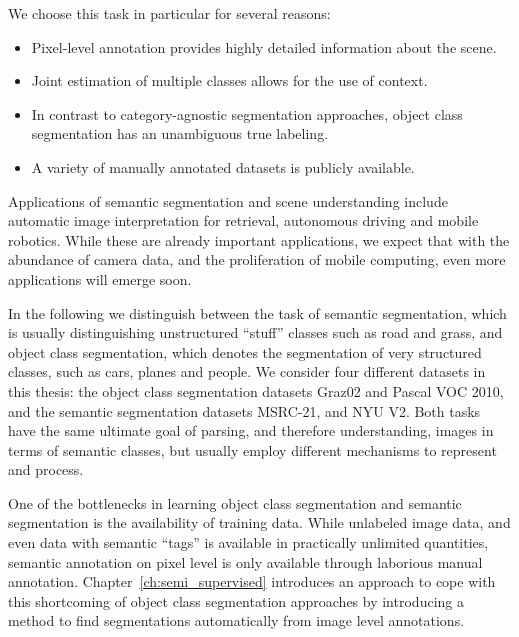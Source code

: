 We choose this task in particular for several reasons:
\begin{itemize}
    \item Pixel-level annotation provides highly detailed information about the scene.
    \item Joint estimation of multiple classes allows for the use of context.
    \item In contrast to category-agnostic segmentation approaches, object class segmentation
        has an unambiguous true labeling.
    \item A variety of manually annotated datasets is publicly available.
\end{itemize}
%
Applications of semantic segmentation and scene understanding include automatic
image interpretation for retrieval, autonomous driving and mobile robotics.
While these are already important applications, we expect that with the
abundance of camera data, and the proliferation of mobile computing, even
more applications will emerge soon.

In the following we distinguish between the task of semantic segmentation,
which is usually distinguishing unstructured ``stuff'' classes such as road and
grass, and object class segmentation, which denotes the segmentation of very
structured classes, such as cars, planes and people.
We consider four different datasets in this thesis: the object class segmentation
datasets Graz02 and Pascal VOC 2010, and the semantic segmentation datasets MSRC-21,
and NYU V2.
%
Both tasks have the same ultimate goal of parsing, and therefore understanding, images
in terms of semantic classes, but usually employ  different mechanisms to represent and process.

One of the bottlenecks in learning object class segmentation and semantic
segmentation is the availability of training data.  While unlabeled image data,
and even data with semantic
``tags'' is available in practically unlimited quantities, semantic annotation
on pixel level is only available through laborious manual annotation. 
Chapter~\ref{ch:semi_supervised} introduces an approach to cope with this
shortcoming of object class segmentation approaches by introducing a method to
find segmentations automatically from image level annotations.

